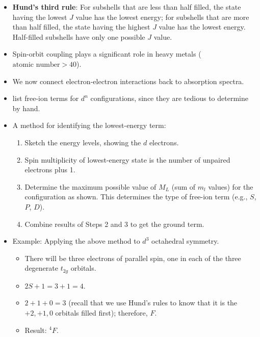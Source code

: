 \documentclass[../notes.tex]{subfiles}
\begin{document}
\begin{itemize}
\begin{itemize}
    \end{itemize}
    \item \textbf{Hund's third rule}: For subshells that are less than half filled, the state having the lowest $J$ value has the lowest energy; for subshells that are more than half filled, the state having the highest $J$ value has the lowest energy. Half-filled subshells have only one possible $J$ value.
    \item Spin-orbit coupling plays a significant role in heavy metals ($\text{atomic number}>40$).
    \item We now connect electron-electron interactions back to absorption spectra.
    \item \textcite{bib:MiesslerFischerTarr} list free-ion terms for $d^n$ configurations, since they are tedious to determine by hand.
    \item A method for identifying the lowest-energy term:
    \begin{enumerate}
        \item Sketch the energy levels, showing the $d$ electrons.
        \item Spin multiplicity of lowest-energy state is the number of unpaired electrons plus 1.
        \item Determine the maximum possible value of $M_L$ (sum of $m_l$ values) for the configuration as shown. This determines the type of free-ion term (e.g., $S$, $P$, $D$).
        \item Combine results of Steps 2 and 3 to get the ground term.
    \end{enumerate}
    \item Example: Applying the above method to $d^3$ octahedral symmetry.
    \begin{itemize}
        \item There will be three electrons of parallel spin, one in each of the three degenerate $t_{2g}$ orbitals.
        \item $2S+1=3+1=4$.
        \item $2+1+0=3$ (recall that we use Hund's rules to know that it is the $+2,+1,0$ orbitals filled first); therefore, $F$.
        \item Result: ${}^4F$.
    \end{itemize}
\end{itemize}
\end{document}
